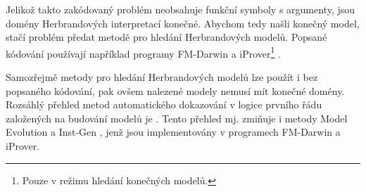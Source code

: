 
Jelikož takto zakódovaný problém neobsahuje funkční symboly
s argumenty, jsou domény Herbrandových interpretací konečné.
Abychom tedy našli konečný model, stačí problém předat metodě
pro hledání Herbrandových modelů.
Popsané kódování používají například programy
FM-Darwin \cite{fmdarwin}
a iProver\footnote{Pouze v režimu hledání konečných modelů.} \cite{iprover}.

Samozřejmě metody pro hledání Herbrandových modelů lze použít
i bez popsaného kódování, pak ovšem nalezené modely nemusí
mít konečné domény. Rozsáhlý přehled metod automatického dokazování
v logice prvního řádu za\-lo\-že\-ných na budování
modelů je \cite{bonacina2015}. Tento přehled mj. zmiňuje
i metody Model Evolution \cite{modelevolution}
a Inst-Gen \cite{instgen}, jenž jsou implementovány
v programech FM-Darwin a iProver.

